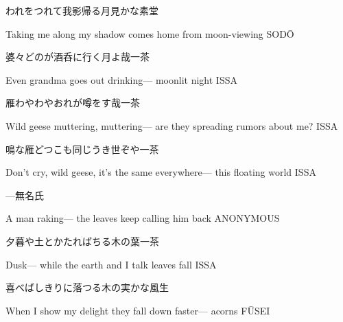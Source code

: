 \begin{haiku}
    {\FH われをつれて我影帰る月見かな}\hfill{\FH 素堂}

    \vin{} Taking me along
    \vin{} \vin{} my shadow comes home
    \vin{} \vin{} \vin{} from moon-viewing \hspace{\fill} SOD\={O}
\end{haiku}

\begin{haiku}
    {\FH 婆々どのが酒呑に行く月よ哉}\hfill{\FH 一茶}

    \vin{} Even grandma
    \vin{} \vin{} goes out drinking---
    \vin{} \vin{} \vin{} moonlit night \hspace{\fill} ISSA
\end{haiku}

\begin{haiku}
    {\FH 雁わやわやおれが噂をす哉}\hfill{\FH 一茶}

    \vin{} Wild geese muttering, muttering---
    \vin{} \vin{} are they spreading
    \vin{} \vin{} \vin{} rumors about me? \hspace{\fill} ISSA
\end{haiku}

\begin{haiku}
    {\FH 鳴な雁どつこも同じうき世ぞや}\hfill{\FH 一茶}

    \vin{} Don't cry, wild geese,
    \vin{} \vin{} it's the same everywhere---
    \vin{} \vin{} \vin{} this floating world \hspace{\fill} ISSA
\end{haiku}

\begin{haiku}
    {---}\hfill{\FH 無名氏}

    \vin{} A man raking---
    \vin{} \vin{} the leaves keep
    \vin{} \vin{} \vin{} calling him back \hspace{\fill} ANONYMOUS
\end{haiku}

\begin{haiku}
    {\FH 夕暮や土とかたればちる木の葉}\hfill{\FH 一茶}

    \vin{} Dusk---
    \vin{} \vin{} while the earth and I talk
    \vin{} \vin{} \vin{} leaves fall \hspace{\fill} ISSA
\end{haiku}

\begin{haiku}
    {\FH 喜べばしきりに落つる木の実かな}\hfill{\FH 風生}

    \vin{} When I show my delight
    \vin{} \vin{} they fall down faster---
    \vin{} \vin{} \vin{} acorns \hspace{\fill} F\={U}SEI
\end{haiku}

